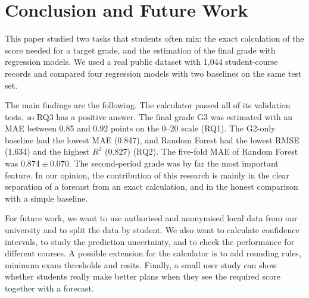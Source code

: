 \documentclass[10pt,twocolumn,a4paper]{article}
\newcommand{\Gthree}{G3}
\begin{document}
\section{Conclusion and Future Work}
This paper studied two tasks that students often mix: the exact calculation of the score needed for a target grade, and the estimation of the final grade with regression models. We used a real public dataset with 1,044 student-course records and compared four regression models with two baselines on the same test set.

The main findings are the following. The calculator passed all of its validation tests, so RQ3 has a positive answer. The final grade \Gthree{} was estimated with an MAE between 0.85 and 0.92 points on the 0--20 scale (RQ1). The G2-only baseline had the lowest MAE (0.847), and Random Forest had the lowest RMSE (1.634) and the highest $R^2$ (0.827) (RQ2). The five-fold MAE of Random Forest was $0.874\pm0.070$. The second-period grade was by far the most important feature. In our opinion, the contribution of this research is mainly in the clear separation of a forecast from an exact calculation, and in the honest comparison with a simple baseline.

For future work, we want to use authorised and anonymised local data from our university and to split the data by student. We also want to calculate confidence intervals, to study the prediction uncertainty, and to check the performance for different courses. A possible extension for the calculator is to add rounding rules, minimum exam thresholds and resits. Finally, a small user study can show whether students really make better plans when they see the required score together with a forecast.



\end{document}
